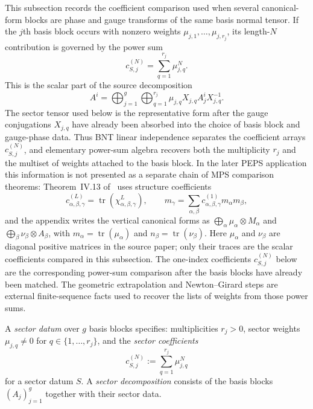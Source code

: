 This subsection records the coefficient comparison used when several
canonical-form blocks are phase and gauge transforms of the same basis
normal tensor.  If the $j$th basis block occurs with nonzero weights
$\mu_{j,1},\dotsc,\mu_{j,r_j}$, its length-$N$ contribution is governed by
the power sum
\[
	c_{S,j}^{(N)}=\sum_{q=1}^{r_j}\mu_{j,q}^{N}.
\]
This is the scalar part of the source decomposition
\[
	A^i=\bigoplus_{j=1}^g\bigoplus_{q=1}^{r_j}
		\mu_{j,q}X_{j,q}A_j^iX_{j,q}^{-1}.
\]
The sector tensor used below is the representative form after the gauge
conjugations $X_{j,q}$ have already been absorbed into the choice of basis
block and gauge-phase data.  Thus BNT linear independence separates the coefficient arrays
$c_{S,j}^{(N)}$, and elementary power-sum algebra recovers both the
multiplicity $r_j$ and the multiset of weights attached to the basis block.
In the later PEPS application this information is not presented as a separate
chain of MPS comparison theorems: Theorem~IV.13 of~\cite{Cirac2017MPDO_AnnPhys} uses
structure coefficients
\[
	c_{\alpha,\beta,\gamma}^{(L)}
	=\operatorname{tr}\!\left(\chi_{\alpha,\beta,\gamma}^L\right),
	\qquad
	m_\gamma=\sum_{\alpha,\beta}c_{\alpha,\beta,\gamma}^{(1)}
		m_\alpha m_\beta,
\]
and the appendix writes the vertical canonical forms as
$\bigoplus_\alpha \mu_\alpha\otimes M_\alpha$ and
$\bigoplus_\beta \nu_\beta\otimes A_\beta$, with
$m_\alpha=\operatorname{tr}(\mu_\alpha)$ and
$n_\beta=\operatorname{tr}(\nu_\beta)$.
Here $\mu_\alpha$ and $\nu_\beta$ are diagonal positive matrices in the
source paper; only their traces are the scalar coefficients compared in this
subsection.
The one-index coefficients $c_{S,j}^{(N)}$ below are the corresponding
power-sum comparison after the basis blocks have already been matched.  The
geometric extrapolation and Newton--Girard steps are external finite-sequence
facts used to recover the lists of weights from those power sums.

\begin{definition}%
\label{def:paper_sector_data}
	\leanok
	A \emph{sector datum} over $g$ basis blocks specifies:
	multiplicities $r_j > 0$, sector weights
	$\mu_{j,q} \neq 0$ for $q \in \{1,\dotsc,r_j\}$, and the
	\emph{sector coefficients}
	\[
		c_{S,j}^{(N)} := \sum_{q=1}^{r_j} \mu_{j,q}^N
	\]
	for a sector datum $S$.
	A \emph{sector decomposition} consists of the basis blocks
	$(A_j)_{j=1}^g$ together with their sector data.
\end{definition}

